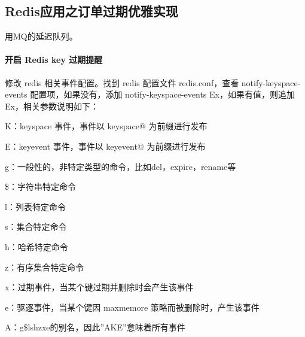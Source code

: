\documentclass[../../../interview-questions.tex]{subfiles}
\begin{document}
\subsection{Redis应用之订单过期优雅实现}

用MQ的延迟队列。

\paragraph{开启 Redis key 过期提醒}


修改 redis 相关事件配置。找到 redis 配置文件 redis.conf，查看 notify-keyspace-events 配置项，如果没有，添加 notify-keyspace-events Ex，如果有值，则追加 Ex，相关参数说明如下：

K：keyspace 事件，事件以 keyspace@ 为前缀进行发布

E：keyevent 事件，事件以 keyevent@ 为前缀进行发布

g：一般性的，非特定类型的命令，比如del，expire，rename等

\$：字符串特定命令

l：列表特定命令

s：集合特定命令

h：哈希特定命令

z：有序集合特定命令

x：过期事件，当某个键过期并删除时会产生该事件

e：驱逐事件，当某个键因 maxmemore 策略而被删除时，产生该事件

A：g\$lshzxe的别名，因此”AKE”意味着所有事件
\end{document}
